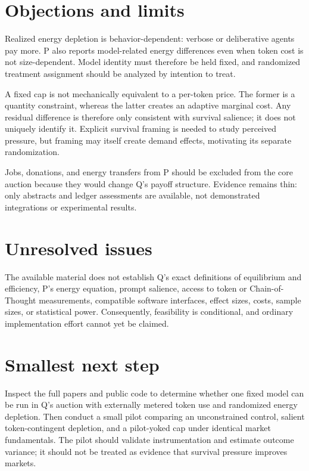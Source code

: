 \documentclass{article}
\begin{document}
\section{Objections and limits}

Realized energy depletion is behavior-dependent: verbose or deliberative agents pay more. P also reports model-related energy differences even when token cost is not size-dependent. Model identity must therefore be held fixed, and randomized treatment assignment should be analyzed by intention to treat.

A fixed cap is not mechanically equivalent to a per-token price. The former is a quantity constraint, whereas the latter creates an adaptive marginal cost. Any residual difference is therefore only consistent with survival salience; it does not uniquely identify it. Explicit survival framing is needed to study perceived pressure, but framing may itself create demand effects, motivating its separate randomization.

Jobs, donations, and energy transfers from P should be excluded from the core auction because they would change Q's payoff structure. Evidence remains thin: only abstracts and ledger assessments are available, not demonstrated integrations or experimental results.

\section{Unresolved issues}

The available material does not establish Q's exact definitions of equilibrium and efficiency, P's energy equation, prompt salience, access to token or Chain-of-Thought measurements, compatible software interfaces, effect sizes, costs, sample sizes, or statistical power. Consequently, feasibility is conditional, and ordinary implementation effort cannot yet be claimed.

\section{Smallest next step}

Inspect the full papers and public code to determine whether one fixed model can be run in Q's auction with externally metered token use and randomized energy depletion. Then conduct a small pilot comparing an unconstrained control, salient token-contingent depletion, and a pilot-yoked cap under identical market fundamentals. The pilot should validate instrumentation and estimate outcome variance; it should not be treated as evidence that survival pressure improves markets.
\end{document}
